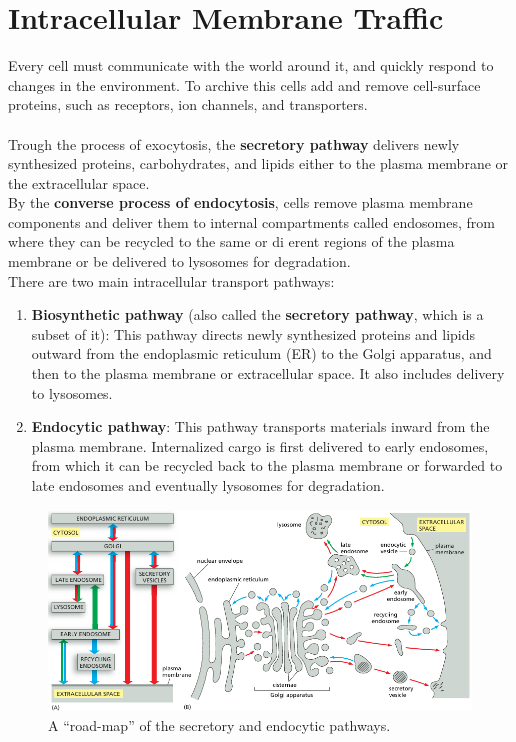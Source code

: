\documentclass[../main.tex]{subfiles}
\begin{document}
\section{Intracellular Membrane Traffic}
Every cell must communicate with the world around it, and quickly respond to changes in the environment. To archive this cells add and remove cell-surface proteins, such as receptors, ion channels, and transporters. \\
\\
Trough the process of exocytosis, the \textbf{secretory pathway} delivers newly synthesized proteins, carbohydrates, and lipids either to the plasma membrane or the extracellular space. \\
\indent By the \textbf{converse process of endocytosis}, cells remove plasma membrane components and deliver them to internal compartments called endosomes, from where they can be recycled to the same or di erent regions of the plasma membrane or be delivered to lysosomes for degradation. \\

There are two main intracellular transport pathways:
\begin{enumerate}
	\item \textbf{Biosynthetic pathway} (also called the \textbf{secretory pathway}, which is a subset of it): This pathway directs newly synthesized proteins and lipids outward from the endoplasmic reticulum (ER) to the Golgi apparatus, and then to the plasma membrane or extracellular space. It also includes delivery to lysosomes.
	
	\item \textbf{Endocytic pathway}: This pathway transports materials inward from the plasma membrane. Internalized cargo is first delivered to early endosomes, from which it can be recycled back to the plasma membrane or forwarded to late endosomes and eventually lysosomes for degradation.
\end{enumerate}

\begin{figure}[H]
	\centering
	\includegraphics[width=\textwidth]{3}
	\caption{A “road-map” of the secretory and endocytic pathways.}
	\label{roead_map}
\end{figure}
\end{document}
